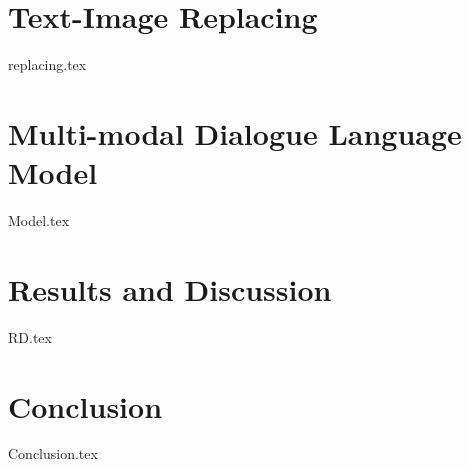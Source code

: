 \documentclass{article}
\begin{document}
\section{Text-Image Replacing}
{replacing.tex}

\section{Multi-modal Dialogue Language Model}
{Model.tex}


\section{Results and Discussion}
{RD.tex}


\section{Conclusion}
{Conclusion.tex}







\end{document}
